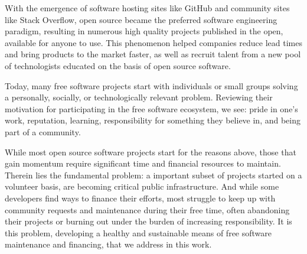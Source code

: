 With the emergence of software hosting sites like GitHub and community sites
like Stack Overflow, open source became the preferred software engineering
paradigm, resulting in numerous high quality projects published in the open,
available for anyone to use. This phenomenon helped
companies reduce lead times and bring products to the market faster, as well as
recruit talent from a new pool of technologists educated on the basis of
open source software.

Today, many free software projects start with individuals or small groups
solving a personally, socially, or technologically relevant problem.
Reviewing their motivation for participating in the free software ecosystem,
we see: pride in one's work, reputation, learning,
responsibility for something they believe in, and being part of a community.

While most open source software projects start for the reasons above, those
that gain momentum require significant time and financial resources to
maintain. Therein lies the fundamental problem: a important subset of projects
started on a volunteer basis, are becoming critical public
infrastructure. And while some developers find ways to finance their efforts,
most struggle to keep up with community requests and maintenance during their
free time, often abandoning their projects or burning out under the burden of
increasing responsibility. It is this problem, developing a healthy and
sustainable means of free software maintenance and financing, that we address
in this work.
